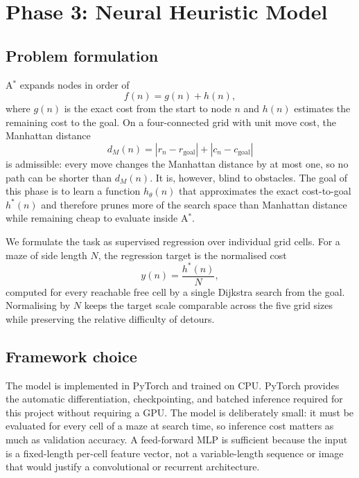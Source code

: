 \section{Phase 3: Neural Heuristic Model}
\label{sec:phase3_model}

\subsection{Problem formulation}
A$^\ast$ expands nodes in order of
\begin{equation}
  f(n) = g(n) + h(n),
\end{equation}
where $g(n)$ is the exact cost from the start to node $n$ and $h(n)$ estimates
the remaining cost to the goal. On a four-connected grid with unit move cost,
the Manhattan distance
\begin{equation}
  d_M(n) = |r_n-r_{\text{goal}}| + |c_n-c_{\text{goal}}|
\end{equation}
is admissible: every move changes the Manhattan distance by at most one, so no
path can be shorter than $d_M(n)$. It is, however, blind to obstacles. The goal
of this phase is to learn a function $h_\theta(n)$ that approximates the exact
cost-to-goal $h^\ast(n)$ and therefore prunes more of the search space than
Manhattan distance while remaining cheap to evaluate inside A$^\ast$.

We formulate the task as supervised regression over individual grid cells. For
a maze of side length $N$, the regression target is the normalised cost
\begin{equation}
  y(n) = \frac{h^\ast(n)}{N},
\end{equation}
computed for every reachable free cell by a single Dijkstra search from the
goal. Normalising by $N$ keeps the target scale comparable across the five grid
sizes while preserving the relative difficulty of detours.

\subsection{Framework choice}
The model is implemented in PyTorch and trained on CPU. PyTorch provides the
automatic differentiation, checkpointing, and batched inference required for
this project without requiring a GPU. The model is deliberately small: it must
be evaluated for every cell of a maze at search time, so inference cost matters
as much as validation accuracy. A feed-forward MLP is sufficient because the
input is a fixed-length per-cell feature vector, not a variable-length sequence
or image that would justify a convolutional or recurrent architecture.

